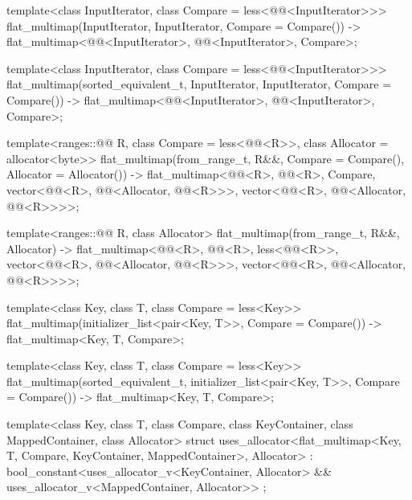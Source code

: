 \begin{codeblock}
{  template<class InputIterator, class Compare = less<@@<InputIterator>>>
    flat_multimap(InputIterator, InputIterator, Compare = Compare())
      -> flat_multimap<@@<InputIterator>, @@<InputIterator>, Compare>;

  template<class InputIterator, class Compare = less<@@<InputIterator>>>
    flat_multimap(sorted_equivalent_t, InputIterator, InputIterator, Compare = Compare())
      -> flat_multimap<@@<InputIterator>, @@<InputIterator>, Compare>;

  template<ranges::@@ R, class Compare = less<@@<R>>,
           class Allocator = allocator<byte>>
    flat_multimap(from_range_t, R&&, Compare = Compare(), Allocator = Allocator())
      -> flat_multimap<@@<R>, @@<R>, Compare,
                       vector<@@<R>,
                              @@<Allocator, @@<R>>>,
                       vector<@@<R>,
                              @@<Allocator, @@<R>>>>;

  template<ranges::@@ R, class Allocator>
    flat_multimap(from_range_t, R&&, Allocator)
      -> flat_multimap<@@<R>, @@<R>, less<@@<R>>,
                       vector<@@<R>,
                              @@<Allocator, @@<R>>>,
                       vector<@@<R>,
                              @@<Allocator, @@<R>>>>;

  template<class Key, class T, class Compare = less<Key>>
    flat_multimap(initializer_list<pair<Key, T>>, Compare = Compare())
      -> flat_multimap<Key, T, Compare>;

  template<class Key, class T, class Compare = less<Key>>
    flat_multimap(sorted_equivalent_t, initializer_list<pair<Key, T>>, Compare = Compare())
      -> flat_multimap<Key, T, Compare>;

  template<class Key, class T, class Compare, class KeyContainer, class MappedContainer,
           class Allocator>
    struct uses_allocator<flat_multimap<Key, T, Compare, KeyContainer, MappedContainer>,
                          Allocator>
      : bool_constant<uses_allocator_v<KeyContainer, Allocator> &&
                      uses_allocator_v<MappedContainer, Allocator>> { };
}
\end{codeblock}

